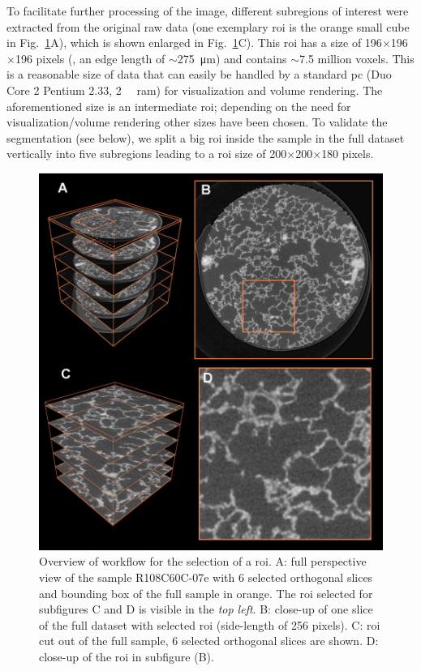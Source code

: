 To facilitate further processing of the image, different subregions of interest were extracted from the original raw data (one exemplary \ac{roi} is the orange small cube in Fig.~\ref{fig:srxtm}A), which is shown enlarged in Fig.~\ref{fig:srxtm}C). This \ac{roi} has a size of 196$\times$196$\times$196 pixels (\ie, an edge length of $\sim$\SI{275}{\micro\meter}) and contains $\sim$7.5 million voxels. This is a reasonable size of data that can easily be handled by a standard \acs{pc} (Duo Core 2 Pentium \SI{2.33}{\gigahertz}, \SI{2}{\giga\byte} \acs{ram}) for visualization and volume rendering. The aforementioned size is an intermediate \ac{roi}; depending on the need for visualization/volume rendering other sizes have been chosen. To validate the segmentation (see below), we split a big \ac{roi} inside the sample in the full dataset vertically into five subregions leading to a \ac{roi} size of 200$\times$200$\times$180 pixels.

\renewcommand{\imsize}{\linewidth}
\begin{figure}[p]
	\centering
	\includegraphics[width=\imsize]{img/Tsuda2008/Tsuda-05}
	\caption[Overview of workflow for the selection of a region of interest]{Overview of workflow for the selection of a \acf{roi}. A: full perspective view of the sample R108C60C-07e with 6 selected orthogonal slices and
bounding box of the full sample in orange. The \ac{roi} selected for subfigures C and D is
visible in the \textit{top left}. B: close-up of one slice of the full dataset with selected \ac{roi} (side-length of 256 pixels). C: \ac{roi} cut out of the full sample, 6 selected orthogonal slices are shown. D: close-up of the \ac{roi} in subfigure (B).}
	\label{fig:srxtm}
\end{figure}

